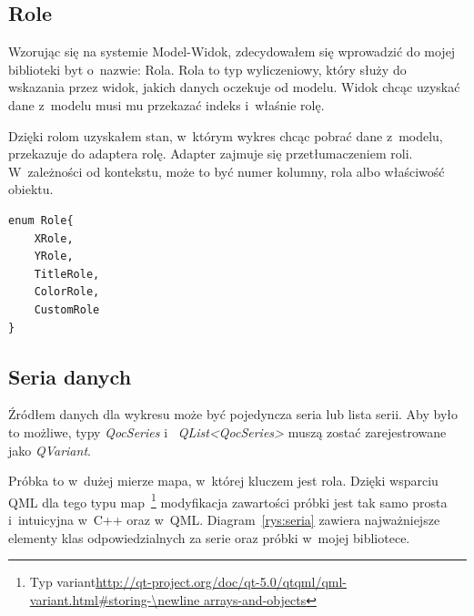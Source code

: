 \subsection{Role}
Wzorując się na systemie Model-Widok, zdecydowałem się wprowadzić do mojej biblioteki byt o~nazwie: Rola. Rola to typ wyliczeniowy, który służy do wskazania przez widok, jakich danych oczekuje od modelu. Widok chcąc uzyskać dane z~modelu musi mu przekazać indeks i~właśnie rolę.

Dzięki rolom uzyskałem stan, w~którym wykres chcąc pobrać dane z~modelu, przekazuje do adaptera rolę. Adapter zajmuje się przetłumaczeniem roli. W~zależności od kontekstu, może to być numer kolumny, rola  albo właściwość obiektu.

\begin{lstlisting}[caption=Rola -- typ wyliczeniowy, label=code:role]
enum Role{
	XRole,
	YRole,
	TitleRole,
	ColorRole,
	CustomRole
}
\end{lstlisting}



\subsection{Seria danych}
Źródłem danych dla wykresu może być pojedyncza seria lub lista serii. Aby było to możliwe, typy \textit{QocSeries} i~ \textit{QList<QocSeries>} muszą zostać zarejestrowane jako \textit{QVariant}.

Próbka to w~dużej mierze mapa, w~której kluczem jest rola. Dzięki wsparciu QML dla tego typu map~\footnote{Typ variant\url{http://qt-project.org/doc/qt-5.0/qtqml/qml-variant.html\#storing-\newline arrays-and-objects}} modyfikacja zawartości próbki jest tak samo prosta i~intuicyjna w~C++ oraz w~QML. Diagram~\ref{rys:seria} zawiera najważniejsze elementy klas odpowiedzialnych za serie oraz próbki w~mojej bibliotece.

